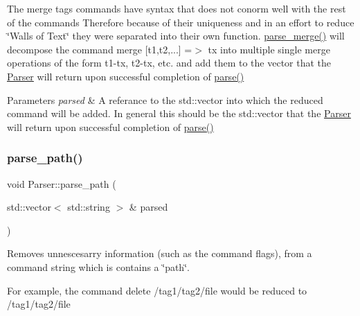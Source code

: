 The \textquotesingle{}merge tags\textquotesingle{} commands have syntax that does not conorm well with the rest of the commands Therefore because of their uniqueness and in an effort to reduce \char`\"{}\+Walls of Text\char`\"{} they were separated into their own function. \mbox{\hyperlink{class_parser_a4dff2c17612843df95b4ec6d4e4af847}{parse\+\_\+merge()}} will decompose the command \textquotesingle{}merge \mbox{[}t1,t2,...\mbox{]} =$>$ tx\textquotesingle{} into multiple single merge operations of the form \textquotesingle{}t1-\/tx\textquotesingle{}, \textquotesingle{}t2-\/tx\textquotesingle{}, etc. and add them to the vector that the \mbox{\hyperlink{class_parser}{Parser}} will return upon successful completion of \mbox{\hyperlink{class_parser_a5b531e9ed867eeb8ccb9cb088cf35c24}{parse()}}


\begin{DoxyParams}{Parameters}
{\em parsed} & A referance to the std\+::vector into which the reduced command will be added. In general this should be the std\+::vector that the \mbox{\hyperlink{class_parser}{Parser}} will return upon successful completion of \mbox{\hyperlink{class_parser_a5b531e9ed867eeb8ccb9cb088cf35c24}{parse()}} \\
\hline
\end{DoxyParams}
\mbox{\label{class_parser_a8e7cd45cdf0fe9f3420f26a54a946f56}} 
\subsubsection{\texorpdfstring{parse\+\_\+path()}{parse\_path()}}
{\footnotesize\ttfamily void Parser\+::parse\+\_\+path (\begin{DoxyParamCaption}\item[{std\+::vector$<$ std\+::string $>$ \&}]{parsed }\end{DoxyParamCaption})\hspace{0.3cm}{\ttfamily [private]}}



Removes unnescesarry information (such as the command flags), from a command string which is contains a \char`\"{}path\char`\"{}. 

For example, the command \textquotesingle{}delete /tag1/tag2/file\textquotesingle{} would be reduced to \textquotesingle{}/tag1/tag2/file\textquotesingle{}


